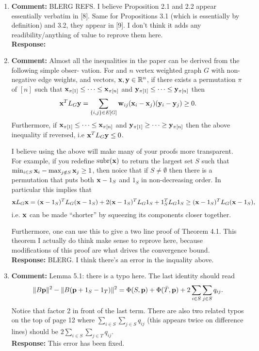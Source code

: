 \documentclass[a4paper,10pt]{article}
\begin{document}
\begin{enumerate}

\item\textbf{Comment:} 
BLERG REFS.  I believe Proposition 2.1 and 2.2 appear essentially verbatim in [8]. Same for Propositions
3.1 (which is essentially by definition) and 3.2, they appear in [9]. I don’t think it adds any
readibility/anything of value to reprove them here.
\\\textbf{Response:}

\newcommand{\rng}{\operatorname{rng}}
\newcommand{\subrng}{\operatorname{subr}}
\newcommand{\decrng}{\operatorname{decrng}}

\item\textbf{Comment:} 
Almost all the inequalities in the paper can be derived from the following simple obser-
vation.  For and $n$ vertex weighted graph $G$ with non-negative edge weights, and vectors, $\mathbf{x},\mathbf{y} \in {\mathbb R}^n$, if there exists a permutation $\pi$ of $[n]$ such that $\mathbf{x}_{\pi[1]} \leq \dots \leq \mathbf{x}_{\pi[n]}$ and $\mathbf{y}_{\pi[1]} \leq \dots \leq \mathbf{y}_{\pi[n]}$ then
\[
\mathbf{x}^T L_G \mathbf{y} = \sum_{ \{i,j\} \in E[G] } \mathbf{w}_{ij} (\mathbf{x}_{i} - \mathbf{x}_{j}) (\mathbf{y}_{i} - \mathbf{y}_{j}) \geq 0.
\]
Furthermore, if $\mathbf{x}_{\pi[1]} \leq \dots \leq \mathbf{x}_{\pi[n]}$ and $\mathbf{y}_{\pi[1]} \geq \dots \geq \mathbf{y}_{\pi[n]}$ then the above inequality if reversed, i.e $\mathbf{x}^T L_G \mathbf{y} \leq 0$. 

I believe using the above will make many of your proofs more transparent.  For example, if you redefine $\subrng(\xbf)$ to return the largest set $S$ such that $\min_{i\in S} \mathbf{x}_i - \max_{j \notin S} \mathbf{x}_j \geq 1$, then noice that if $S \neq \emptyset$ then there is a permutation that puts both $\mathbf{x} - 1_S$ and $1_S$ in non-decreasing order. In particular this implies that
\[
\mathbf{x} L_G \mathbf{x} = (\mathbf{x} - 1_S)^T L_G (\mathbf{x} - 1_S) + 2(\mathbf{x} - 1_S)^T L_G 1_S + 1_S^T L_G 1_S \geq (\mathbf{x} - 1_S)^T L_G (\mathbf{x} - 1_S),
\]
i.e. $\mathbf{x}$ can be made ``shorter'' by squeezing its components closer together.

Furthermore, one can use this to give a two line proof of Theorem 4.1.  This theorem I actually do think make sense to reprove here, because modifications of this proof are what drives the convergence bound. 
\\\textbf{Response:}
BLERG.  I think there's an error in the inquality above.

\item\textbf{Comment:} 
Lemma 5.1: there is a typo here.  The last identity should read
\[
\|B\mathbf{p}\|^2 - \|B(\mathbf{p} + 1_S - 1_T)\|^2 = \Phi(S,\mathbf{p}) + \Phi(\bar{T}, \mathbf{p}) + 2\sum_{i \in S}\sum_{j\in S} q_{ij}.
\]
Notice that factor 2 in front of the last term.  There are also two related typos on the top of page 12 where $\sum_{i \in S}\sum_{j\in S} q_{ij}$ (this appears twice on difference lines) should be $2\sum_{i \in S}\sum_{j\in T} q_{ij}$.
\\\textbf{Response:}
This error has been fixed.



\end{enumerate}
\end{document}
